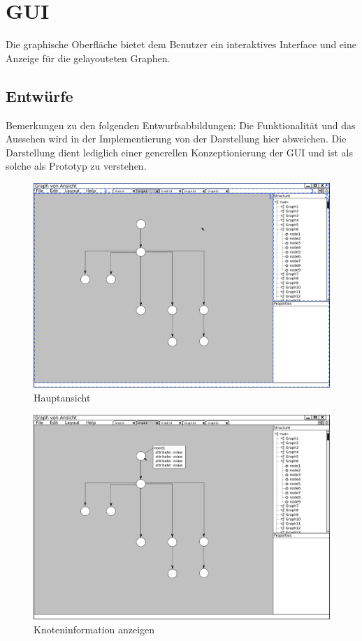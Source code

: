 \section{GUI}\label{sec:uigui}

Die graphische Oberfläche bietet dem Benutzer ein interaktives Interface und eine Anzeige für die gelayouteten Graphen. %

\subsection{Entwürfe}

Bemerkungen zu den folgenden Entwurfsabbildungen: Die Funktionalität und das Aussehen wird in der Implementierung von der Darstellung hier abweichen. Die Darstellung dient lediglich einer generellen Konzeptionierung der GUI und ist als solche als Prototyp zu verstehen.

\begin{figure}[ht]
  \centering
  \includegraphics[width=380pt]{resourcen/gui_view_treeview.png}
  \caption{Hauptansicht}
  \label{fig:gui_view_treeview}
\end{figure}

\begin{figure}[ht]
  \centering
  \includegraphics[width=380pt]{resourcen/gui_view_showInfoInView_node.png}
  \caption{Knoteninformation anzeigen}
  \label{fig:gui_view_showInfoInView_node}
\end{figure}

